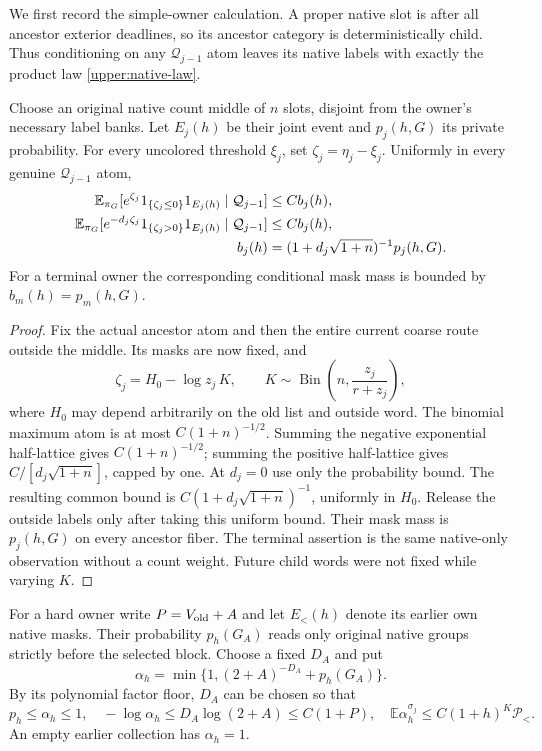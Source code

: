 We first record the simple-owner calculation.  A proper native slot is
after all ancestor exterior deadlines, so its ancestor category is
deterministically child.  Thus conditioning on any $\mathcal Q_{j-1}$
atom leaves its native labels with exactly the product law
\eqref{upper:native-law}.

\begin{lemma}
\label{upper:simple-kernels}
Choose an original native count middle of $n$ slots, disjoint from
the owner's necessary label banks.  Let $E_j(h)$ be their joint event
and $p_j(h,G)$ its private probability.  For every uncolored threshold
$\xi_j$, set $\zeta_j=\eta_j-\xi_j$.  Uniformly in every genuine
$\mathcal Q_{j-1}$ atom,
\begin{align}
 \mathbb E_{\pi_G}[e^{\zeta_j}1_{\{\zeta_j\leq0\}}1_{E_j(h)}
                   \mid\mathcal Q_{j-1}]&\leq Cb_j(h),\notag\\
 \mathbb E_{\pi_G}[e^{-d_j\zeta_j}1_{\{\zeta_j>0\}}1_{E_j(h)}
                   \mid\mathcal Q_{j-1}]&\leq Cb_j(h),
 \label{upper:simple-half-lines}\\
 b_j(h)&=(1+d_j\sqrt{1+n})^{-1}p_j(h,G).\notag
\end{align}
For a terminal owner the corresponding conditional mask mass is bounded
by $b_m(h)=p_m(h,G)$.
\end{lemma}

\begin{proof}
Fix the actual ancestor atom and then the entire current coarse route
outside the middle.  Its masks are now fixed, and
\[
 \zeta_j=H_0-\log z_j\,K,\qquad
 K\sim\operatorname{Bin}\left(n,\frac{z_j}{r+z_j}\right),
\]
where $H_0$ may depend arbitrarily on the old list and outside word.
The binomial maximum atom is at most $C(1+n)^{-1/2}$.  Summing the
negative exponential half-lattice gives $C(1+n)^{-1/2}$; summing
the positive half-lattice gives $C/[d_j\sqrt{1+n}]$, capped by one.
At $d_j=0$ use only the probability bound.  The resulting common
bound is $C(1+d_j\sqrt{1+n})^{-1}$, uniformly in $H_0$.
Release the outside labels only after taking this uniform bound.
Their mask mass is $p_j(h,G)$ on every ancestor fiber.  The terminal
assertion is the same native-only observation without a count weight.
Future child words were not fixed while varying $K$.
\end{proof}

For a hard owner write $P=V_{\rm old}+A$ and let $E_<(h)$ denote
its earlier own native masks.  Their probability $p_h(G_A)$ reads
only original native groups strictly before the selected block.
Choose a fixed $D_A$ and put
\begin{equation}
 \alpha_h=\min\{1,(2+A)^{-D_A}+p_h(G_A)\}.
 \label{upper:short-prefix-floor}
\end{equation}
By its polynomial factor floor, $D_A$ can be chosen so that
\begin{equation}
 p_h\leq\alpha_h\leq1,\quad
 -\log\alpha_h\leq D_A\log(2+A)\leq C(1+P),\quad
 \mathbb E\alpha_h^{\sigma_j}\leq C(1+h)^K\mathcal P_<.
 \label{upper:alpha-bounds}
\end{equation}
An empty earlier collection has $\alpha_h=1$.

